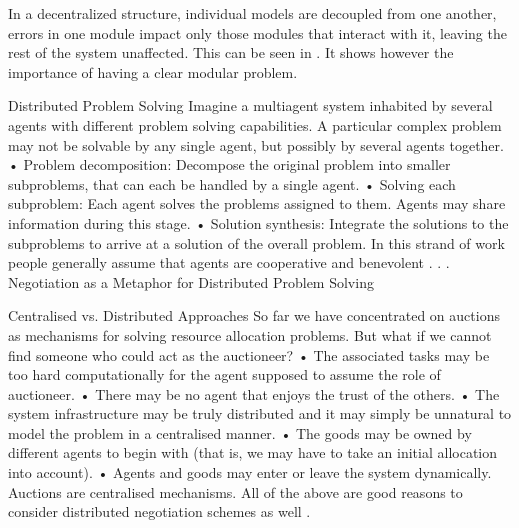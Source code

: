 In a decentralized structure, individual models are decoupled from one another, errors in one module impact only those modules that interact with it, leaving the rest of the system unaffected. This can be seen in . It shows however the importance of having a clear modular problem. 

Distributed Problem Solving
Imagine a multiagent system inhabited by several agents with different
problem solving capabilities. A particular complex problem may not be
solvable by any single agent, but possibly by several agents together.
• Problem decomposition: Decompose the original problem into
smaller subproblems, that can each be handled by a single agent.
• Solving each subproblem: Each agent solves the problems
assigned to them. Agents may share information during this stage.
• Solution synthesis: Integrate the solutions to the subproblems to
arrive at a solution of the overall problem.
In this strand of work people generally assume that agents are
cooperative and benevolent . . . Negotiation as a Metaphor for Distributed Problem
Solving

Centralised vs. Distributed Approaches
So far we have concentrated on auctions as mechanisms for solving
resource allocation problems. But what if we cannot find someone who
could act as the auctioneer?
• The associated tasks may be too hard computationally for the
agent supposed to assume the role of auctioneer.
• There may be no agent that enjoys the trust of the others.
• The system infrastructure may be truly distributed and it may
simply be unnatural to model the problem in a centralised manner.
• The goods may be owned by different agents to begin with
(that is, we may have to take an initial allocation into account).
• Agents and goods may enter or leave the system dynamically.
Auctions are centralised mechanisms. All of the above are good
reasons to consider distributed negotiation schemes as well .



